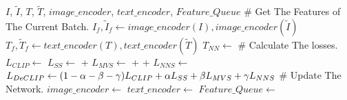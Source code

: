 


\begin{algorithm}
    \caption{DeCLIP}
    \begin{algorithmic}[1] %
        \Require $I$, $\tilde{I}$, $T$, $\tilde{T}$, $image\_encoder$, $text\_encoder$, $Feature\_Queue$
            \State \textcolor[RGB]{64,128,128}{$\#$ Get The Features of The Current Batch.}
            \State $I_f, \tilde{I}_f \gets image\_encoder(I), image\_encoder(\tilde{I})$
            \State $T_f, \tilde{T}_f \gets text\_encoder(T), text\_encoder(\tilde{T})$
            \State $T_{NN} \gets$ 
            \State
            \State \textcolor[RGB]{64,128,128}{$\#$ Calculate The losses.}
            \State $L_{CLIP} \gets$ 
            \State $L_{SS} \gets$  + 
            \State $L_{MVS} \gets$  +  + 
            \State $L_{NNS} \gets$ 
            \State $L_{DeCLIP} \gets (1 - \alpha - \beta - \gamma)L_{CLIP} + \alpha L_{SS} + \beta L_{MVS} + \gamma L_{NNS}$
            \State
            \State \textcolor[RGB]{64,128,128}{$\#$ Update The Network.}
            \State $image\_encoder \gets$ 
            \State $text\_encoder \gets$ 
            \State $Feature\_Queue \gets$ 

\end{algorithmic}
\end{algorithm}
